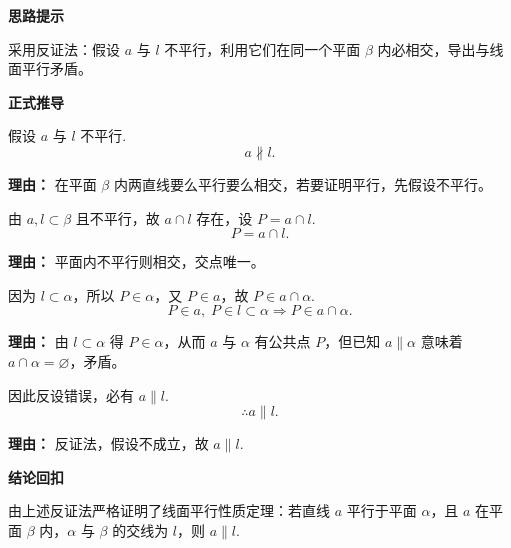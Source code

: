 \begin{proofbox}
	\textbf{\textcolor{CProof}{思路提示}}

	采用反证法：假设 $a$ 与 $l$ 不平行，利用它们在同一个平面 $\beta$ 内必相交，导出与线面平行矛盾。

	\medskip
	\textbf{\textcolor{CProof}{正式推导}}
	\begin{description}[style=nextline, leftmargin=2.8em, labelsep=0.5em, itemsep=0.55em]
		\item[\textbf{步骤一（反设结论）：}] 假设 $a$ 与 $l$ 不平行.
			\[
				a\nparallel l.
			\]
			\par\textbf{理由：}
			在平面 $\beta$ 内两直线要么平行要么相交，若要证明平行，先假设不平行。

		\item[\textbf{步骤二（相交得公共点）：}] 由 $a,l\subset\beta$ 且不平行，故 $a\cap l$ 存在，设 $P=a\cap l$.
			\[
				P=a\cap l.
			\]
			\par\textbf{理由：}
			平面内不平行则相交，交点唯一。

		\item[\textbf{步骤三（导出与已知矛盾）：}] 因为 $l\subset\alpha$，所以 $P\in\alpha$，又 $P\in a$，故 $P\in a\cap\alpha$.
			\[
				P\in a,\; P\in l\subset\alpha \Rightarrow P\in a\cap\alpha.
			\]
			\par\textbf{理由：}
			由 $l\subset\alpha$ 得 $P\in\alpha$，从而 $a$ 与 $\alpha$ 有公共点 $P$，但已知 $a\parallel\alpha$ 意味着 $a\cap\alpha=\varnothing$，矛盾。

		\item[\textbf{步骤四（结论成立）：}] 因此反设错误，必有 $a\parallel l$.
			\[
				\therefore a\parallel l.
			\]
			\par\textbf{理由：}
			反证法，假设不成立，故 $a\parallel l$.
	\end{description}

	\medskip
	\textbf{\textcolor{CProof}{结论回扣}}

	由上述反证法严格证明了线面平行性质定理：若直线 $a$ 平行于平面 $\alpha$，且 $a$ 在平面 $\beta$ 内，$\alpha$ 与 $\beta$ 的交线为 $l$，则 $a\parallel l$.
\end{proofbox}
